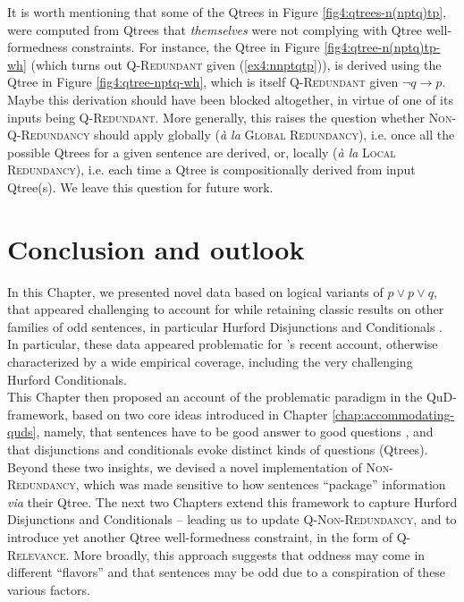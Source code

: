 It is worth mentioning that some of the Qtrees in Figure \ref{fig4:qtrees-n(nptq)tp}, were computed from Qtrees that \textit{themselves} were not complying with Qtree well-formedness constraints. For instance, the Qtree in Figure \ref{fig4:qtree-n(nptq)tp-wh} (which turns out \textsc{Q-Redundant} given (\ref{ex4:nnptqtp})), is derived using the Qtree in Figure \ref{fig4:qtree-nptq-wh}, which is itself \textsc{Q-Redundant} given $\neg q\rightarrow p$. Maybe this derivation should have been blocked altogether, in virtue of one of its inputs being \textsc{Q-Redundant}. More generally, this raises the question whether \textsc{Non-Q-Redundancy} should apply globally (\textit{à la} \textsc{Global Redundancy}), i.e. once all the possible Qtrees for a given sentence are derived, or, locally (\textit{à la} \textsc{Local Redundancy}), i.e. each time a Qtree is compositionally derived from input Qtree(s). We leave this question for future work.



\section{Conclusion and outlook}\label{sec4:conclusion}
In this Chapter, we presented novel data based on logical variants of $p \vee p \vee q$, that appeared challenging to account for while retaining classic results on other families of odd sentences, in particular Hurford Disjunctions and Conditionals \citep{Hurford1974, Mandelkern2018}. In particular, these data appeared problematic for \citeauthor{Kalomoiros2024}'s recent account, otherwise characterized by a wide empirical coverage, including the very challenging Hurford Conditionals.\\

This Chapter then proposed an account of the problematic paradigm in the QuD-framework, based on two core ideas introduced in Chapter \ref{chap:accommodating-quds}, namely, that sentences have to be good answer to good questions \citep{Katzir2015}, and that disjunctions and conditionals evoke distinct kinds of questions (Qtrees). Beyond these two insights, we devised a novel implementation of \textsc{Non-Redundancy}, which was made sensitive to how sentences ``package'' information \textit{via} their Qtree. The next two Chapters extend this framework to capture Hurford Disjunctions and Conditionals \citep{Hurford1974,Mandelkern2018} -- leading us to update \textsc{Q-Non-Redundancy}, and to introduce yet another Qtree well-formedness constraint, in the form of \textsc{Q-Relevance}. More broadly, this approach suggests that oddness may come in different ``flavors'' and that sentences may be odd due to a conspiration of these various factors.\\

